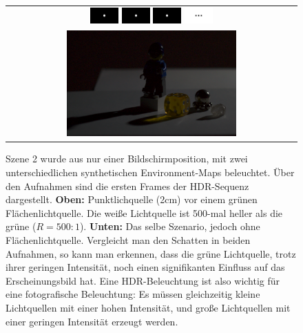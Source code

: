 \begin{figure}[H]
\begin{tabular}{c}
 \\
        \includegraphics[width=0.1\textwidth]{../graphics/ergebnisse/hdr_frame_1_green.png} \hspace{5mm}
        \includegraphics[width=0.1\textwidth]{../graphics/ergebnisse/hdr_frame_1_green.png} \hspace{5mm}
      \includegraphics[width=0.1\textwidth]{../graphics/ergebnisse/hdr_frame_1_green.png} \hspace{5mm}
      \includegraphics[width=0.1\textwidth]{../graphics/ergebnisse/hdr_frame_dots.png} \hspace{4mm}
      \hfill
  \\
     \includegraphics[width=0.6\textwidth]{../graphics/ergebnisse/hdr_result_nogreen_small.png} \\
    \end{tabular}
    \caption[Ergebnis: Szene 2]{Szene 2 wurde aus nur einer Bildschirmposition, mit zwei unterschiedlichen synthetischen Environment-Maps beleuchtet. Über den Aufnahmen sind die ersten Frames der HDR-Sequenz dargestellt. 
   \textbf{Oben:} Punktlichquelle (2cm) vor einem grünen Flächenlichtquelle. Die weiße Lichtquelle ist 500-mal heller als die grüne ($R=500:1$).
   \textbf{ Unten:} Das selbe Szenario, jedoch ohne Flächenlichtquelle. 
     Vergleicht man den Schatten in beiden Aufnahmen, so kann man erkennen, dass die grüne Lichtquelle, trotz ihrer geringen Intensität, noch einen signifikanten Einfluss auf das Erscheinungsbild hat.
     Eine HDR-Beleuchtung ist also wichtig für eine fotografische Beleuchtung: Es müssen gleichzeitig kleine Lichtquellen mit einer hohen Intensität, und große Lichtquellen mit einer geringen Intensität erzeugt werden.
}
    \label{fig:szene2}
   \end{figure}



   




